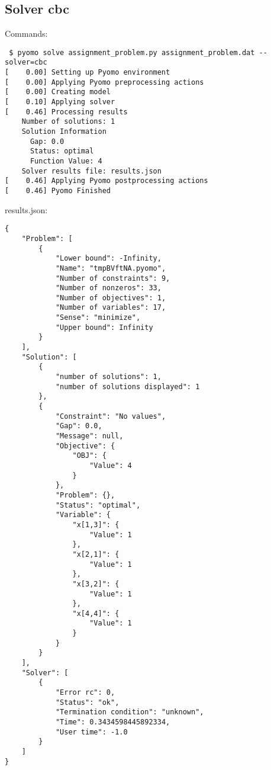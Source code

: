 \documentclass[a4paper]{article}
\begin{document}
\subsection*{Solver cbc}
Commands:
\begin{verbatim}
 $ pyomo solve assignment_problem.py assignment_problem.dat --solver=cbc
[    0.00] Setting up Pyomo environment
[    0.00] Applying Pyomo preprocessing actions
[    0.00] Creating model
[    0.10] Applying solver
[    0.46] Processing results
    Number of solutions: 1
    Solution Information
      Gap: 0.0
      Status: optimal
      Function Value: 4
    Solver results file: results.json
[    0.46] Applying Pyomo postprocessing actions
[    0.46] Pyomo Finished
\end{verbatim}
results.json:
\begin{verbatim}
{
    "Problem": [
        {
            "Lower bound": -Infinity, 
            "Name": "tmpBVftNA.pyomo", 
            "Number of constraints": 9, 
            "Number of nonzeros": 33, 
            "Number of objectives": 1, 
            "Number of variables": 17, 
            "Sense": "minimize", 
            "Upper bound": Infinity
        }
    ], 
    "Solution": [
        {
            "number of solutions": 1, 
            "number of solutions displayed": 1
        }, 
        {
            "Constraint": "No values", 
            "Gap": 0.0, 
            "Message": null, 
            "Objective": {
                "OBJ": {
                    "Value": 4
                }
            }, 
            "Problem": {}, 
            "Status": "optimal", 
            "Variable": {
                "x[1,3]": {
                    "Value": 1
                }, 
                "x[2,1]": {
                    "Value": 1
                }, 
                "x[3,2]": {
                    "Value": 1
                }, 
                "x[4,4]": {
                    "Value": 1
                }
            }
        }
    ], 
    "Solver": [
        {
            "Error rc": 0, 
            "Status": "ok", 
            "Termination condition": "unknown", 
            "Time": 0.3434598445892334, 
            "User time": -1.0
        }
    ]
}\end{verbatim}

\end{document}
